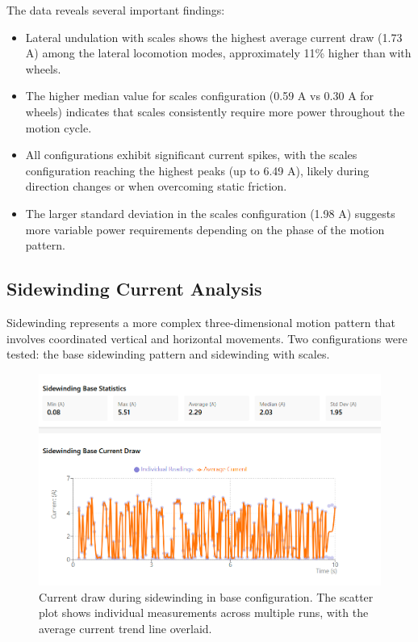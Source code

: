 \documentclass[12pt,a4paper]{report}
\begin{document}
The data reveals several important findings:
\begin{itemize}
    \item Lateral undulation with scales shows the highest average current draw (1.73 A) among the lateral locomotion modes, approximately 11\% higher than with wheels.
    \item The higher median value for scales configuration (0.59 A vs 0.30 A for wheels) indicates that scales consistently require more power throughout the motion cycle.
    \item All configurations exhibit significant current spikes, with the scales configuration reaching the highest peaks (up to 6.49 A), likely during direction changes or when overcoming static friction.
    \item The larger standard deviation in the scales configuration (1.98 A) suggests more variable power requirements depending on the phase of the motion pattern.
\end{itemize}

\subsection{Sidewinding Current Analysis}
Sidewinding represents a more complex three-dimensional motion pattern that involves coordinated vertical and horizontal movements. Two configurations were tested: the base sidewinding pattern and sidewinding with scales.

\begin{figure}[H]
    \centering
    \includegraphics[width=12cm]{media/sidewinding_base_current.png}
    \caption{Current draw during sidewinding in base configuration. The scatter plot shows individual measurements across multiple runs, with the average current trend line overlaid.}
    \label{fig:sidewinding_base_current}
\end{figure}
\end{document}

